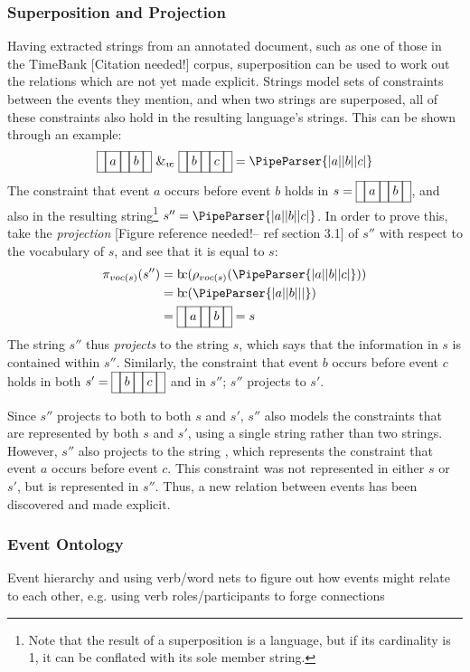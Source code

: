 \documentclass[a4paper,12pt,leqno]{article}
\newcommand{\bc}{{\rm b\!c}}
\newcommand{\vph}[1]{\vphantom{#1}}
\newcommand{\ebox}[1]{\fbox{$\vph{'(),}#1$}}
\newcommand{\nbBefore}[2]{\ebox{#1}\ebox{}\ebox{#2}}
\newcommand{\Before}[2]{\ebox{}\nbBefore{#1}{#2}\ebox{}}
\newcommand{\spvc}{~\&_{v\!c}~}
\newcommand{\EventString}[1]{
	\renewcommand*{\do}[1]{\ebox{##1}}%
	\PipeParser{#1}
}
\newcommand{\refneeded}[1][]{{\color{red}[Figure reference needed!#1]}}
\newcommand{\citeneeded}[1][]{{\color{red}[Citation needed!#1]}}
\begin{document}
\subsubsection{Superposition and Projection}\label{ssub:superposition}
Having extracted strings from an annotated document, such as one of those in the TimeBank \citeneeded{} corpus, superposition can be used to work out the relations which are not yet made explicit. Strings model sets of constraints between the events they mention, and when two strings are superposed, all of these constraints also hold in the resulting language's strings. This can be shown through an example:
\begin{align}
\Before{a}{b} \spvc \Before{b}{c} = \EventString{{}|a|{}|b|{}|c|{}}
\end{align}
The constraint that event $a$ occurs before event $b$ holds in $s = \Before{a}{b}$, and also in the resulting string\footnote{Note that the result of a superposition is a language, but if its cardinality is 1, it can be conflated with its sole member string.} $s'' = \EventString{{}|a|{}|b|{}|c|{}}$. In order to prove this, take the \textit{projection} \refneeded[-- ref section 3.1]{} of $s''$ with respect to the vocabulary of $s$, and see that it is equal to $s$:
\begin{align}
\pi_{voc(s)}(s'') &= \bc(\rho_{voc(s)}(\EventString{{}|a|{}|b|{}|c|{}}))\\ \notag
				  &= \bc(\EventString{{}|a|{}|b|{}|{}|{}})\\ \notag
				  &= \Before{a}{b} = s
\end{align}
The string $s''$ thus \textit{projects} to the string $s$, which says that the information in $s$ is contained within $s''$. Similarly, the constraint that event $b$ occurs before event $c$ holds in both $s' = \Before{b}{c}$ and in $s''$; $s''$ projects to $s'$.

Since $s''$ projects to both to both $s$ and $s'$, $s''$ also models the constraints that are represented by both $s$ and $s'$, using a single string rather than two strings. However, $s''$ also projects to the string \Before{a}{c}, which represents the constraint that event $a$ occurs before event $c$. This constraint was not represented in either $s$ or $s'$, but is represented in $s''$. Thus, a new relation between events has been discovered and made explicit. 

\subsubsection{Event Ontology}\label{ssub:ontology}
Event hierarchy and using verb/word nets to figure out how events might relate to each other, e.g. using verb roles/participants to forge connections
\end{document}
